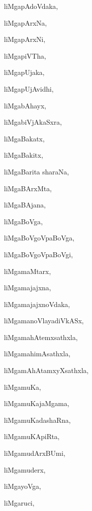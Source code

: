 \begin{multicols}{2}
{liMgapAdoVdaka}, \pageref{liMgapAdoVdaka}

{liMgapArxNa}, \pageref{liMgapArxNa}

{liMgapArxNi}, \pageref{liMgapArxNi}

{liMgapiVTha}, \pageref{liMgapiVTha}

{liMgapUjaka}, \pageref{liMgapUjaka}

{liMgapUjAvidhi}, \pageref{liMgapUjAvidhi}

{liMgabAhayx}, \pageref{liMgabAhayx}

{liMgabiVjAkaSxra}, \pageref{liMgabiVjAkaSxra}

{liMgaBakatx}, \pageref{liMgaBakatx}

{liMgaBakitx}, \pageref{liMgaBakitx}

{liMgaBarita sharaNa}, \pageref{liMgaBaritasharaNa}

{liMgaBArxMta}, \pageref{liMgaBArxMta}

{liMgaBAjana}, \pageref{liMgaBAjana}

{liMgaBoVga}, \pageref{liMgaBoVga}

{liMgaBoVgoVpaBoVga}, \pageref{liMgaBoVgoVpaBoVga}

{liMgaBoVgoVpaBoVgi}, \pageref{liMgaBoVgoVpaBoVgi}

{liMgamaMtarx}, \pageref{liMgamaMtarx}

{liMgamajajxna}, \pageref{liMgamajajxna}

{liMgamajajxnoVdaka}, \pageref{liMgamajajxnoVdaka}

{liMgamanoVlayadiVkASx}, \pageref{liMgamanoVlayadiVkASx}

{liMgamahAtemxsathxla}, \pageref{liMgamahAtemxsathxla}

{liMgamahimAsathxla}, \pageref{liMgamahimAsathxla}

{liMgamAhAtamxyXsathxla}, \pageref{liMgamAhAtamxyXsathxla}

{liMgamuKa}, \pageref{liMgamuKa}

{liMgamuKajaMgama}, \pageref{liMgamuKajaMgama}

{liMgamuKadashaRna}, \pageref{liMgamuKadashaRna}

{liMgamuKApiRta}, \pageref{liMgamuKApiRta}

{liMgamudArxBUmi}, \pageref{liMgamudArxBUmi}

{liMgamuderx}, \pageref{liMgamuderx}

{liMgayoVga}, \pageref{liMgayoVga}

{liMgaruci}, \pageref{liMgaruci}


\end{multicols}
